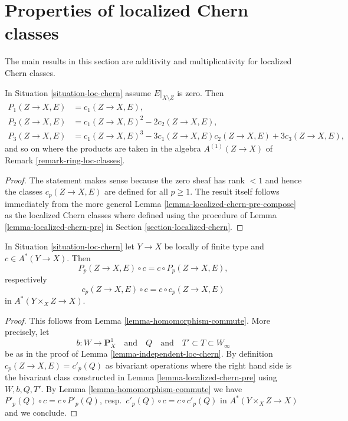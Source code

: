 \section{Properties of localized Chern classes}
\label{section-properties-loc-chern}

\noindent
The main results in this section are additivity and multiplicativity
for localized Chern classes.

\begin{lemma}
\label{lemma-loc-chern-character}
In Situation \ref{situation-loc-chern} assume $E|_{X \setminus Z}$ is zero.
Then
\begin{align*}
P_1(Z \to X, E) & = c_1(Z \to X, E), \\
P_2(Z \to X, E) & = c_1(Z \to X, E)^2 - 2c_2(Z \to X, E), \\
P_3(Z \to X, E) & = c_1(Z \to X, E)^3 - 3c_1(Z \to X, E)c_2(Z \to X, E)
+ 3c_3(Z \to X, E),
\end{align*}
and so on where the products are taken in the algebra $A^{(1)}(Z \to X)$
of Remark \ref{remark-ring-loc-classes}.
\end{lemma}

\begin{proof}
The statement makes sense because the zero sheaf has rank $< 1$ and
hence the classes $c_p(Z \to X, E)$ are defined for all $p \geq 1$.
The result itself follows immediately from the more general
Lemma \ref{lemma-localized-chern-pre-compose} as the localized Chern
classes where defined using the procedure of
Lemma \ref{lemma-localized-chern-pre}
in Section \ref{section-localized-chern}.
\end{proof}

\begin{lemma}
\label{lemma-loc-chern-classes-commute}
In Situation \ref{situation-loc-chern}
let $Y \to X$ be locally of finite type and $c \in A^*(Y \to X)$.
Then
$$
P_p(Z \to X, E) \circ c = c \circ P_p(Z \to X, E),
$$
respectively
$$
c_p(Z \to X, E) \circ c = c \circ c_p(Z \to X, E)
$$
in $A^*(Y \times_X Z \to X)$.
\end{lemma}

\begin{proof}
This follows from Lemma \ref{lemma-homomorphism-commute}.
More precisely, let
$$
b : W \to \mathbf{P}^1_X
\quad\text{and}\quad
Q
\quad\text{and}\quad
T' \subset T \subset W_\infty
$$
be as in the proof of Lemma \ref{lemma-independent-loc-chern}.
By definition $c_p(Z \to X, E) = c'_p(Q)$
as bivariant operations
where the right hand side is the bivariant class constructed in
Lemma \ref{lemma-localized-chern-pre} using $W, b, Q, T'$.
By Lemma \ref{lemma-homomorphism-commute} we have
$P'_p(Q) \circ c = c \circ P'_p(Q)$, resp.\ $c'_p(Q) \circ c = c \circ c'_p(Q)$
in $A^*(Y \times_X Z \to X)$ and we conclude.
\end{proof}

